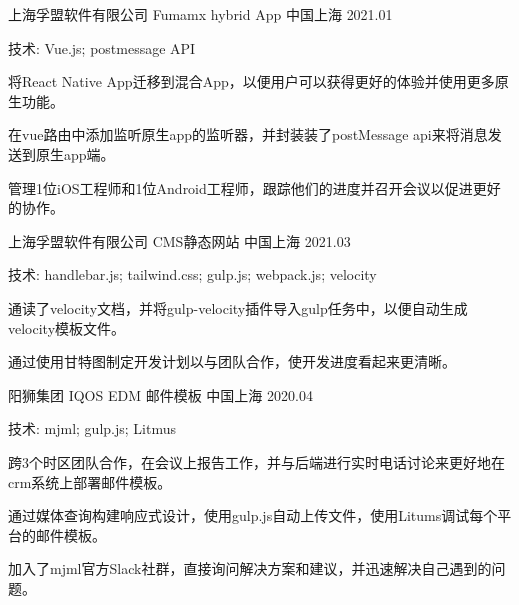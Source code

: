 

\begin{cventries}


  \cventry
    {上海孚盟软件有限公司} %
    {Fumamx hybrid App} %
    {中国上海} %
    {2021.01} %
    {
      \begin{cvitems} %
        \item {技术: Vue.js; postmessage API}
        \item {将React Native App迁移到混合App，以便用户可以获得更好的体验并使用更多原生功能。}
        \item {在vue路由中添加监听原生app的监听器，并封装装了postMessage api来将消息发送到原生app端。}
        \item {管理1位iOS工程师和1位Android工程师，跟踪他们的进度并召开会议以促进更好的协作。}
      \end{cvitems}
    }


    \cventry
    {上海孚盟软件有限公司} %
    {CMS静态网站} %
    {中国上海} %
    {2021.03} %
    {
      \begin{cvitems} %
        \item {技术: handlebar.js; tailwind.css; gulp.js; webpack.js; velocity }
        \item {通读了velocity文档，并将gulp-velocity插件导入gulp任务中，以便自动生成velocity模板文件。}
        \item {通过使用甘特图制定开发计划以与团队合作，使开发进度看起来更清晰。}
      \end{cvitems}
    }

    \cventry
    {阳狮集团} %
    {IQOS EDM 邮件模板} %
    {中国上海} %
    {2020.04} %
    {
      \begin{cvitems} %
        \item {技术: mjml; gulp.js; Litmus }
        \item {跨3个时区团队合作，在会议上报告工作，并与后端进行实时电话讨论来更好地在crm系统上部署邮件模板。}
        \item {通过媒体查询构建响应式设计，使用gulp.js自动上传文件，使用Litums调试每个平台的邮件模板。}
        \item {加入了mjml官方Slack社群，直接询问解决方案和建议，并迅速解决自己遇到的问题。}
      \end{cvitems}
    }
    
\end{cventries}
